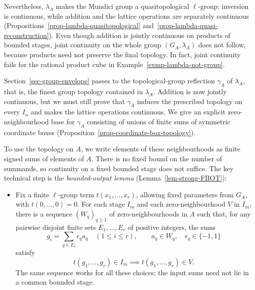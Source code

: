 \documentclass[preprint,3p]{elsarticle}
\theoremstyle{plain}
\theoremstyle{definition}
\numberwithin{equation}{section}
\begin{document}
Nevertheless, $\lambda_A$ makes the Mundici group a quasitopological
$\ell$-group: inversion is continuous, while addition and the lattice
operations are separately continuous
(Propositions~\ref{prop-lambda-quasitopological}
and~\ref{prop-lambda-quasi-reconstruction}).
Even though addition is jointly continuous on products of bounded
stages, joint continuity on the whole group $(G_A,\lambda_A)$ does
not follow, because products need not preserve the final topology.
In fact, joint continuity fails for the rational product cube in
Example~\ref{exmp-lambda-not-group}.

Section~\ref{sec-group-envelope} passes to the topological-group
reflection $\gamma_A$ of $\lambda_A$, that is, the finest group
topology contained in $\lambda_A$.
Addition is now jointly continuous, but we must still prove that
$\gamma_A$ induces the prescribed topology on every $I_n$ and makes
the lattice operations continuous.
We give an explicit zero-neighbourhood base for $\gamma_A$ consisting
of unions of finite sums of symmetric coordinate boxes
(Proposition~\ref{prop-coordinate-box-topology}).

To use the topology on $A$, we write elements of these neighbourhoods
as finite signed sums of elements of $A$.
There is no fixed bound on the number of summands, so continuity on
a fixed bounded stage does not suffice.
The key technical step is the \emph{bounded-output lemma}
(Lemma~\ref{lem-strong-FBOT}):
\begin{itemize}
\item Fix a finite $\ell$-group term $t(x_1,\ldots,x_r)$, allowing
fixed parameters from $G_A$, with $t(0,\ldots,0)=0$.
For each stage $I_m$ and each zero-neighbourhood $V$ in $I_m$,
there is a sequence $(W_q)_{q\geq1}$ of zero-neighbourhoods in $A$
such that, for any pairwise disjoint finite sets $E_1,\ldots,E_r$
of positive integers, the sums
\[
 g_i=\sum_{q\in E_i}\epsilon_q a_q\quad(1\leq i\leq r),
 \qquad a_q\in W_q,\quad \epsilon_q\in\{-1,1\}
\]
satisfy
\[
 t(g_1,\ldots,g_r)\in I_m
 \implies
 t(g_1,\ldots,g_r)\in V.
\]
The same sequence works for all these choices; the input sums
need not lie in a common bounded stage.
\end{itemize}
\end{document}
